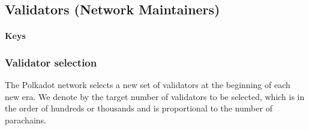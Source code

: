 \subsection{Validators (Network Maintainers)}
 \paragraph{Keys}

 \subsubsection{Validator selection}

 The Polkadot network selects a new set of validators at the beginning of each new era. We denote by \nval the target number of validators to be selected, which is in the order of hundreds or thousands and is proportional to the number of parachains. 
